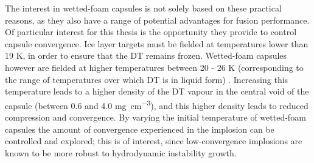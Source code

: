 The interest in wetted-foam capsules is not solely based on these practical reasons, as they also have a range of potential advantages for fusion performance. Of particular interest for this thesis is the opportunity they provide to control capsule convergence. Ice layer targets must be fielded at temperatures lower than 19 K, in order to ensure that the DT remains frozen. Wetted-foam capsules however are fielded at higher temperatures between 20 - 26 K (corresponding to the range of temperatures over which DT is in liquid form) \cite{Olson2016}. Increasing this temperature leads to a higher density of the DT vapour in the central void of the capsule (between 0.6 and 4.0 \unit{\milli\gram\per\centi\meter\cubed}), and this higher density leads to reduced compression and convergence. By varying the initial temperature of wetted-foam capsules the amount of convergence experienced in the implosion can be controlled and explored; this is of interest, since low-convergence implosions are known to be more robust to hydrodynamic instability growth.



